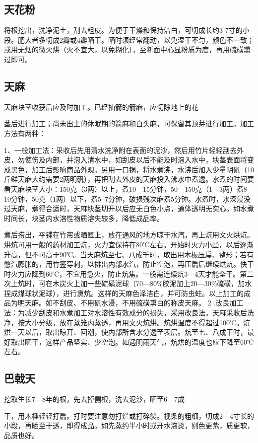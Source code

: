 \documentclass{ctexbook}
\begin{document}
\subsection{天花粉}
将根挖出，洗净泥土，刮去粗皮。为便于干燥和保持洁白，可切成长约3-7寸的小段。肥大者多切成2瓣或4瓣晒干。晒时须经常翻动，以免湿干不匀，颜色不一致；或用无烟的微火烘（火不宜大，以免糊化），至断面中心显粉质为度，再用硫磺熏过即可。
\subsection{天麻}
天麻块茎收获后应及时加工。已经抽箭的箭麻，应切除地上的花

茎后进行加工；尚未出土的休眠期的箭麻和白头麻，可保留其顶芽进行加工。加工方法有两种：

1、一般加工法：采收后先用清水洗净附在表面的泥沙，然后用竹片轻轻刮去外皮，勿使伤及内部，并泡入清水中，如刮皮以后不能及时泡入水中，块茎表面将变成黑色，加工后影响商品外观。另用一口锅，将水煮沸，水沸后加入少量明矾（10斤鲜天麻大约需要2两明矾），再把刮去外皮的天麻投入沸水中煮透。水煮的时间要看天麻块茎大小：150克（3两）以上，煮10—15分钟，50—150克（1—3两）煮8--10分钟，50克（1两）以下，煮5--7分钟，破损残次麻煮5分钟。水煮时，水深浸没过天麻，煮得合适时，天麻块茎切开以后应无白色小点，通体透明无实心。如水煮时间长，块茎内水溶性物质溶失较多，降低成品率。

煮后捞出，平铺在竹帘或晒匾上，放在通风的地方晾干水汽，再上炕用文火烘炕。烘炕可用一般的药材加工炕，火力宜保持在80℃左右。开始时火力小些，以后逐渐升高，但不可高于90℃。当天麻炕至七、八成千时，取出用木板压扁、整形；若有憋汽膨胀的，用竹签穿刺，以排出内部水汽，防止空泡，再压扁后继续烘炕。快干时火力应降到60℃，不宜用急火，防止炕焦。一般需连续炕3—4天才能全干。第二次上炕时，可在木炭火上加一些硫磺泥球（70—80\%胶泥加上20—30\%硫磺，加水捏成煤球状泥球），进行熏炕。这样的天麻色泽洁白，并可防虫蛀。以上加工的成品为明天麻。如不刮皮、不用矾水浸，不用硫磺熏白的称皮天麻。
2	.改良加工法：为减少刮皮和水煮加工对水溶性有效成分的损失，采用改良法。天麻采收后洗净，按大小分级，放在蒸笼内蒸透，再用文火炕烘。炕烘温度不得超过100℃。炕烘一天以后，取出晾开、回潮，使内部所含水分透至表层。炕至七、八成干时，最好取出晒干，这样产品坚实、少空泡。如遇阴雨天气，炕烘的温度也应下降至60℃左右。
\subsection{巴戟天}
挖取生长7—8年的根，先去掉侧根，洗去泥沙，晒至6—7成

干，用木棰轻轻打扁。打时要注意勿打烂或打碎裂。视条的粗细，切成2—4寸长的小段，再晒至干透，即得成品。如先蒸约半小时或开水泡烫，则色更紫，质更软，品质也好。
\end{document}
